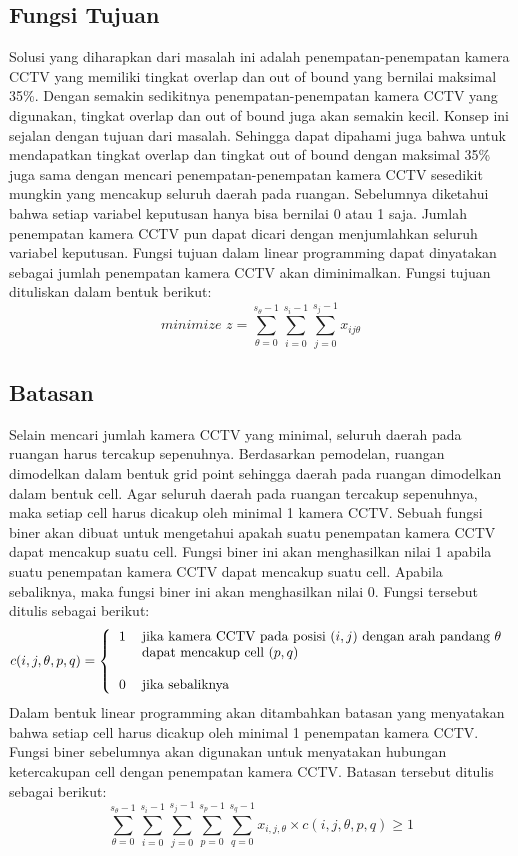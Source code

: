 \subsection{Fungsi Tujuan}
Solusi yang diharapkan dari masalah ini adalah penempatan-penempatan kamera CCTV yang memiliki tingkat overlap dan out of bound yang bernilai maksimal 35\%. Dengan semakin sedikitnya penempatan-penempatan kamera CCTV yang digunakan, tingkat overlap dan out of bound juga akan semakin kecil. Konsep ini sejalan dengan tujuan dari masalah. Sehingga dapat dipahami juga bahwa untuk mendapatkan tingkat overlap dan tingkat out of bound dengan maksimal 35\% juga sama dengan mencari penempatan-penempatan kamera CCTV sesedikit mungkin yang mencakup seluruh daerah pada ruangan. Sebelumnya diketahui bahwa setiap variabel keputusan hanya bisa bernilai 0 atau 1 saja. Jumlah penempatan kamera CCTV pun dapat dicari dengan menjumlahkan seluruh variabel keputusan. Fungsi tujuan dalam linear programming dapat dinyatakan sebagai jumlah penempatan kamera CCTV akan diminimalkan. Fungsi tujuan dituliskan dalam bentuk berikut:
\begin{equation*}
	\textit{minimize }z = \sum_{\theta=0}^{s_{\theta}-1} \sum_{i=0}^{s_i-1} \sum_{j=0}^{s_j-1} x_{ij\theta}
\end{equation*}

\subsection{Batasan}
Selain mencari jumlah kamera CCTV yang minimal, seluruh daerah pada ruangan harus tercakup sepenuhnya. Berdasarkan pemodelan, ruangan dimodelkan dalam bentuk grid point sehingga daerah pada ruangan dimodelkan dalam bentuk cell. Agar seluruh daerah pada ruangan tercakup sepenuhnya, maka setiap cell harus dicakup oleh minimal 1 kamera CCTV. Sebuah fungsi biner akan dibuat untuk mengetahui apakah suatu penempatan kamera CCTV dapat mencakup suatu cell. Fungsi biner ini akan menghasilkan nilai 1 apabila suatu penempatan kamera CCTV dapat mencakup suatu cell. Apabila sebaliknya, maka fungsi biner ini akan menghasilkan nilai 0. Fungsi tersebut ditulis sebagai berikut:
\begin{equation*}
	c(i,j,\theta,p,q) =
	\left \{
		\begin{tabular}{cl}
			1 & jika kamera CCTV pada posisi $(i,j)$ dengan arah pandang $\theta$\\
  			  & dapat mencakup cell $(p,q)$\\
  			  & \\
  			0 & jika sebaliknya
		\end{tabular}
	\right.
\end{equation*}
Dalam bentuk linear programming akan ditambahkan batasan yang menyatakan bahwa setiap cell harus dicakup oleh minimal 1 penempatan kamera CCTV. Fungsi biner sebelumnya akan digunakan untuk menyatakan hubungan ketercakupan cell dengan penempatan kamera CCTV. Batasan tersebut ditulis sebagai berikut:
\begin{equation*}
	\sum_{\theta=0}^{s_{\theta}-1} \sum_{i=0}^{s_i-1} \sum_{j=0}^{s_j-1} \sum_{p=0}^{s_p-1} \sum_{q=0}^{s_q-1} x_{i,j,\theta} \times c(i,j,\theta,p,q) \geq 1
\end{equation*}

